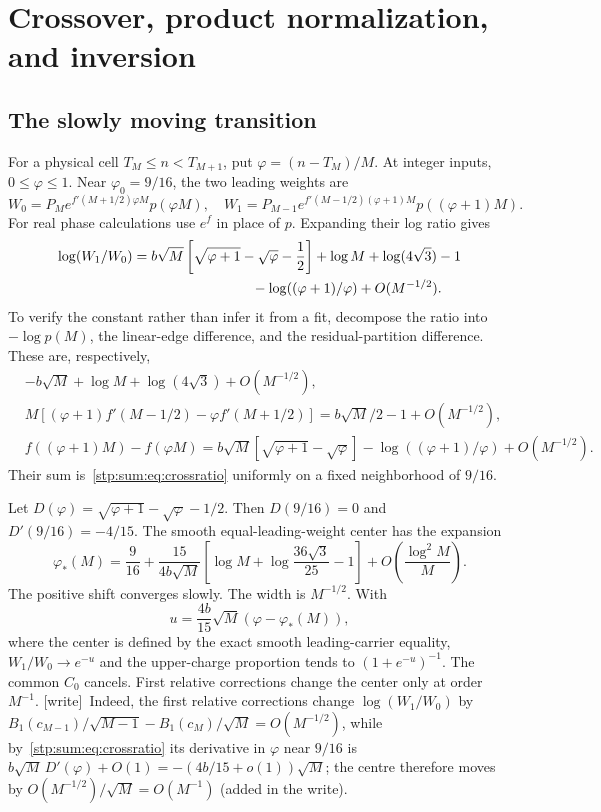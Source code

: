 \documentclass[11pt]{article}
\theoremstyle{remark}\newtheorem{remark}[theorem]{Remark}
\newcommand{\wtag}{\textup{[write]}}
\begin{document}
\section{Crossover, product normalization, and inversion}
\label{stp:sum:sec:crossover}
\subsection{The slowly moving transition}
For a physical cell $T_M\le n<T_{M+1}$, put $\varphi=(n-T_M)/M$. At integer inputs, $0\le\varphi\le1$. Near $\varphi_0=9/16$, the two leading weights are
\[
 W_0=P_Me^{f'(M+1/2)\varphi M}p(\varphi M),\quad
 W_1=P_{M-1}e^{f'(M-1/2)(\varphi+1)M}p((\varphi+1)M).
\]
For real phase calculations use $e^f$ in place of $p$. Expanding their log ratio gives
\begin{align}
 \log(W_1/W_0)
 &=b\sqrt M\left[\sqrt{\varphi+1}-\sqrt\varphi-\frac12\right]
       +\log M+\log(4\sqrt3)-1\notag\\
 &\hspace{30mm}-\log((\varphi+1)/\varphi)+O(M^{-1/2}).
 \label{stp:sum:eq:crossratio}
\end{align}
To verify the constant rather than infer it from a fit, decompose the ratio into
$-\log p(M)$, the linear-edge difference, and the residual-partition difference. These are, respectively,
\begin{align*}
 &-b\sqrt M+\log M+\log(4\sqrt3)+O(M^{-1/2}),\\
 &M[(\varphi+1)f'(M-1/2)-\varphi f'(M+1/2)]
       =b\sqrt M/2-1+O(M^{-1/2}),\\
 &f((\varphi+1)M)-f(\varphi M)
       =b\sqrt M[\sqrt{\varphi+1}-\sqrt\varphi]
          -\log((\varphi+1)/\varphi)+O(M^{-1/2}).
\end{align*}
Their sum is~\eqref{stp:sum:eq:crossratio} uniformly on a fixed neighborhood of $9/16$.

Let $D(\varphi)=\sqrt{\varphi+1}-\sqrt\varphi-1/2$. Then $D(9/16)=0$ and $D'(9/16)=-4/15$. The smooth equal-leading-weight center has the expansion
\begin{equation}\label{stp:sum:eq:center}
 \varphi_*(M)=\frac9{16}
 +\frac{15}{4b\sqrt M}\left[\log M+\log\frac{36\sqrt3}{25}-1\right]
 +O\left(\frac{\log^2M}{M}\right).
\end{equation}
The positive shift converges slowly. The width is $M^{-1/2}$. With
\[
 u=\frac{4b}{15}\sqrt M(\varphi-\varphi_*(M)),
\]
where the center is defined by the exact smooth leading-carrier equality, $W_1/W_0\to e^{-u}$ and the upper-charge proportion tends to $(1+e^{-u})^{-1}$. The common $C_0$ cancels. First relative corrections change the center only at order $M^{-1}$. \wtag\ Indeed, the first relative corrections change $\log(W_1/W_0)$
by $B_1(c_{M-1})/\sqrt{M-1}-B_1(c_M)/\sqrt M=O(M^{-1/2})$, while
by~\eqref{stp:sum:eq:crossratio} its derivative in $\varphi$ near $9/16$ is
$b\sqrt M\,D'(\varphi)+O(1)=-(4b/15+o(1))\sqrt M$; the centre therefore moves
by $O(M^{-1/2})/\sqrt M=O(M^{-1})$ (added in the write).
\end{document}
